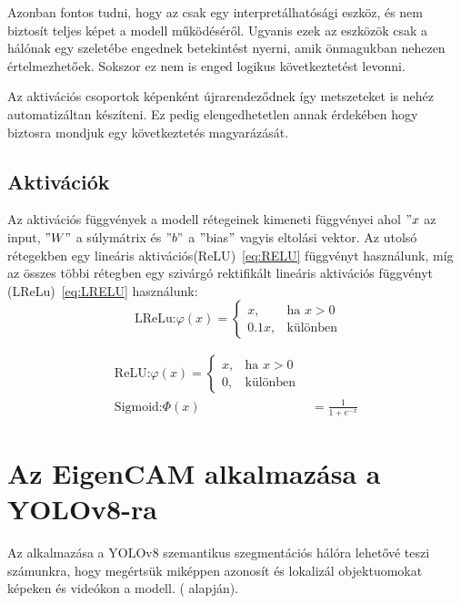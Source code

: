 \documentclass[12pt,oneside,a4paper]{article}
\newcommand{\newsection}[1]{\clearpage\section{#1}}\label{makro}
\theoremstyle{remark}
\begin{document}
	Azonban fontos tudni, hogy az  csak egy interpretálhatósági eszköz, és nem biztosít teljes képet
	a modell működéséről.
	Ugyanis ezek az eszközök csak a hálónak egy szeletébe engednek betekintést nyerni, amik önmagukban nehezen értelmezhetőek.
	Sokszor ez nem is enged logikus következtetést levonni.
	
	Az aktivációs csoportok képenként újrarendeződnek így metszeteket is nehéz automatizáltan készíteni.
	Ez pedig elengedhetetlen annak érdekében hogy biztosra mondjuk egy következtetés magyarázását.
	
	
	
	\subsection{Aktivációk}\label{subsec:activations}
	Az aktivációs függvények a modell rétegeinek kimeneti függvényei ahol \("x\) az input, \("W"\) a súlymátrix és \("b"\) a
	\("\)bias\("\) vagyis eltolási vektor.
	Az utolsó rétegekben egy lineáris aktivációs(\ac{ReLU})~\eqref{eq:RELU}\label{alignhivatkozas} függvényt használunk,
	míg az összes többi rétegben egy
	szivárgó rektifikált lineáris aktivációs függvényt (\ac{LReLu})~\eqref{eq:LRELU}\label{eqhivatkozas} használunk:
	\begin{equation}
		\text{ LReLu:}
		\varphi(x) = \begin{cases}
			x, & \text{ha } x > 0 \\
			0.1x, & \text{különben}
		\end{cases}\label{eq:LRELU}
	\end{equation}\label{eq:activation_functions}
	
	
	\begin{align}
		\text{ReLU:}
		\varphi(x)=\begin{cases}
			x, & \text{ha } x > 0 \\
			0, & \text{különben} \end{cases}\label{eq:RELU} \\
		\text{Sigmoid:}
		\varPhi(x) &= \frac{1}{1 + e^{-x}} \label{eq:Sigmoid}
	\end{align}
	
	\newsection{Az EigenCAM alkalmazása a YOLOv8-ra}\label{sec:az-eigencam-alkalmazasa-a-yolov8-ra}
	Az  alkalmazása a YOLOv8 szemantikus szegmentációs hálóra lehetővé teszi számunkra,
	hogy megértsük miképpen azonosít és lokalizál objektuomokat képeken és videókon a modell.
	(\cite{YoloV8-CAM} alapján).
	
\end{document}

